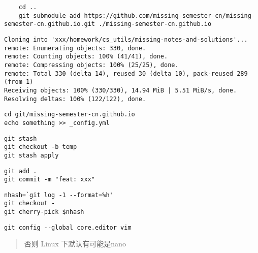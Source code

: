 
\begin{lstlisting}
    cd ..
    git submodule add https://github.com/missing-semester-cn/missing-semester-cn.github.io.git ./missing-semester-cn.github.io
\end{lstlisting}



\begin{verbatim}
Cloning into 'xxx/homework/cs_utils/missing-notes-and-solutions'...
remote: Enumerating objects: 330, done.
remote: Counting objects: 100% (41/41), done.
remote: Compressing objects: 100% (25/25), done.
remote: Total 330 (delta 14), reused 30 (delta 10), pack-reused 289 (from 1)
Receiving objects: 100% (330/330), 14.94 MiB | 5.51 MiB/s, done.
Resolving deltas: 100% (122/122), done.
\end{verbatim}



\begin{lstlisting}
cd git/missing-semester-cn.github.io
echo something >> _config.yml
\end{lstlisting}




\begin{lstlisting}
git stash
git checkout -b temp
git stash apply
\end{lstlisting}



\begin{lstlisting}
git add .
git commit -m "feat: xxx"
\end{lstlisting}



\begin{lstlisting}
nhash=`git log -1 --format=%h'
git checkout -
git cherry-pick $nhash
\end{lstlisting}


\begin{lstlisting}
git config --global core.editor vim
\end{lstlisting}

\begin{quote}
否则 Linux 下默认有可能是nano

\end{quote}

